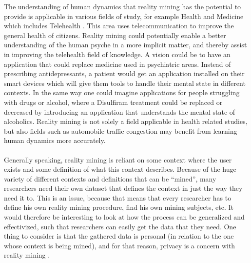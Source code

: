 The understanding of human dynamics that reality mining has the potential to provide is applicable in various fields of study, for example Health and Medicine \parencite{pentland2009_reality_mining_health_medicine} which includes Telehealth \parencite{telehealth_aau}. This area uses telecommunication to improve the general health of citizens. Reality mining could potentially enable a better understanding of the human psyche in a more implicit matter, and thereby assist in improving the telehealth field of knowledge. A vision could be to have an application that could replace medicine used in psychiatric areas. Instead of prescribing antidepressants, a patient would get an application installed on their smart devices which will give them tools to handle their mental state in different contexts. In the same way one could imagine applications for people struggling with drugs or alcohol, where a Disulfiram \parencite{nlm_disulfiram} treatment could be replaced or decreased by introducing an application that understands the mental state of alcoholics. Reality mining is not solely a field applicable in health related studies, but also fields such as automobile traffic congestion \parencite{pentland2009reality_mining_mobile_communication_gps} may benefit from learning human dynamics more accurately.
\\\\
Generally speaking, reality mining is reliant on some context where the user exists and some definition of what this context describes. Because of the huge variety of different contexts and definitions that can be ``mined'', many researchers need their own dataset that defines the context in just the way they need it to. This is an issue, because that means that every researcher has to define his own reality mining procedure, find his own mining subjects, etc. It would therefore be interesting to look at how the process can be generalized and effectivized, such that researchers can easily get the data that they need. One thing to consider is that the gathered data is personal (in relation to the one whose context is being mined), and for that reason, privacy is a concern with reality mining \parencite{madan2009_reality_mining_privacy}.

